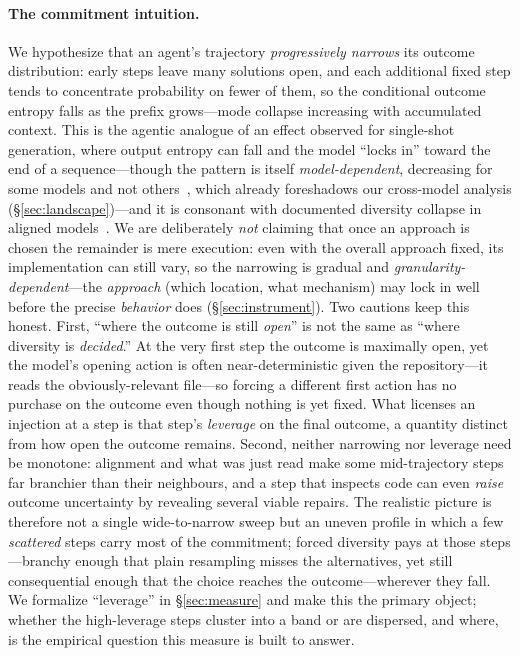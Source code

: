 \documentclass[11pt]{article}
\begin{document}
\paragraph{The commitment intuition.}
We hypothesize that an agent's trajectory \emph{progressively narrows} its outcome
distribution: early steps leave many solutions open, and each additional fixed step
tends to concentrate probability on fewer of them, so the conditional outcome
entropy falls as the prefix grows---mode collapse increasing with accumulated
context. This is the agentic analogue of an effect observed for single-shot
generation, where output entropy can fall and the model ``locks in'' toward the
end of a sequence---though the pattern is itself \emph{model-dependent}, decreasing
for some models and not others~\citep{entropydynamics2026}, which already
foreshadows our cross-model analysis (\S\ref{sec:landscape})---and it is consonant
with documented diversity collapse in aligned
models~\citep{diversitycollapse2025,zhang2025noveltybench}. We are
deliberately \emph{not} claiming that once an approach is chosen the remainder is
mere execution: even with the overall approach fixed, its implementation can still
vary, so the narrowing is gradual and \emph{granularity-dependent}---the
\emph{approach} (which location, what mechanism) may lock in well before the
precise \emph{behavior} does (\S\ref{sec:instrument}). Two cautions keep this honest.
First, ``where the outcome is still \emph{open}'' is not the same as ``where
diversity is \emph{decided}.'' At the very first step the outcome is maximally open,
yet the model's opening action is often near-deterministic given the repository---it
reads the obviously-relevant file---so forcing a different first action has no
purchase on the outcome even though nothing is yet fixed. What licenses an injection
at a step is that step's \emph{leverage} on the final outcome, a quantity distinct
from how open the outcome remains. Second, neither narrowing nor leverage need be
monotone: alignment and what was just read make some mid-trajectory steps far
branchier than their neighbours, and a step that inspects code can even \emph{raise}
outcome uncertainty by revealing several viable repairs. The realistic picture is
therefore not a single wide-to-narrow sweep but an uneven profile in which a few
\emph{scattered} steps carry most of the commitment; forced diversity pays at those
steps---branchy enough that plain resampling misses the alternatives, yet still
consequential enough that the choice reaches the outcome---wherever they fall. We
formalize ``leverage'' in \S\ref{sec:measure} and make this the primary object;
whether the high-leverage steps cluster into a band or are dispersed, and where, is
the empirical question this measure is built to answer.
\end{document}
